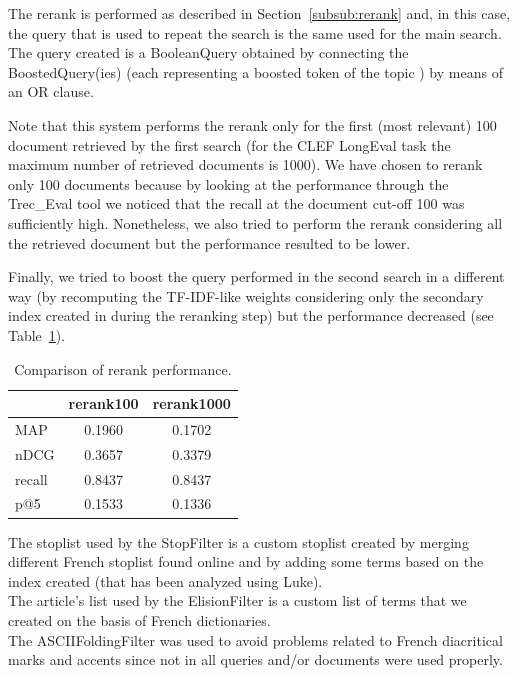 \par
The rerank is performed as described in Section~\ref{subsub:rerank} and, in this case, the query that is used to repeat the search is the same used for the main search. The query created is a BooleanQuery obtained by connecting the BoostedQuery(ies) (each representing a boosted token of the topic ) by means of an OR clause.
\par
Note that this system performs the rerank only for the first (most relevant) 100 document retrieved by the first search (for the CLEF LongEval task the maximum number of retrieved documents is 1000). We have chosen to rerank only 100 documents because by looking at the performance through the Trec\_Eval tool we noticed that the recall at the document cut-off 100 was sufficiently high. Nonetheless, we also tried to perform the rerank considering all the retrieved document but the performance resulted to be lower. 
\par
Finally, we tried to boost the query performed in the second search in a different way (by recomputing the TF-IDF-like weights considering only the secondary index created in during the reranking step) but the performance decreased (see Table~\ref{tab:rerankperf}).

\begin{center}
\begin{table}[tb]
\centering
\begin{tabular}{|l|c|c|} 
 \hline
   & rerank100 & rerank1000  \\
 \hline\hline
 MAP & 0.1960 & 0.1702 \\ 
 nDCG & 0.3657 & 0.3379  \\
 recall & 0.8437 & 0.8437 \\
 p@5 & 0.1533 & 0.1336 \\ 
 \hline
\end{tabular}
\caption{Comparison of rerank performance.}
\label{tab:rerankperf}
\end{table}
\end{center}
\par
The stoplist used by the StopFilter is a custom stoplist created by merging different French stoplist found online and by adding some terms based on the index created (that has been analyzed using Luke).\\
The article’s list used by the ElisionFilter is a custom list of terms that we created on the basis of French dictionaries.\\
The ASCIIFoldingFilter was used to avoid problems related to French diacritical marks and accents since not in all queries and/or documents were used properly.

